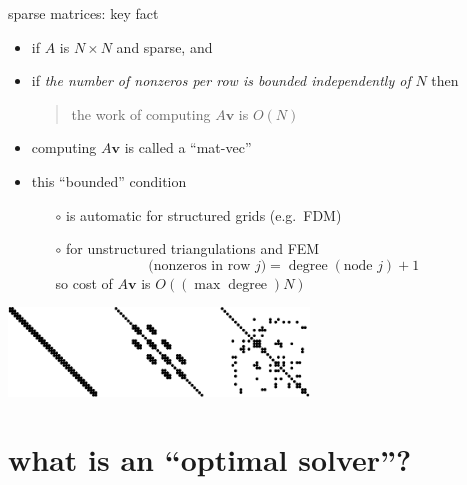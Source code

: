 \documentclass[hide notes,intlimits,usenames,dvipsnames]{beamer}
\newcommand{\bv}{\mathbf{v}}
\begin{document}
\begin{frame}{sparse matrices: key fact}

\begin{itemize}
\item if $A$ is $N\times N$ and sparse, and
\item if \emph{the number of nonzeros per row is bounded independently of} $N$ then
\begin{quote}
the work of computing $A \bv$ is $O(N)$
\end{quote}
\item computing $A \bv$ is called a ``mat-vec''
\item this ``bounded'' condition
	\begin{itemize}
    \item[$\circ$] is automatic for structured grids (e.g.~FDM)
    \item[$\circ$] for unstructured triangulations and FEM
   $$\text{(nonzeros in row } j) = \operatorname{degree}(\text{node } j) + 1$$
	so cost of $A\bv$ is $O((\max \operatorname{degree}) N)$
	\end{itemize}
\end{itemize}

\vspace{5mm}
\begin{center}
\includegraphics[width=0.6\textwidth]{figs/spythree}
\end{center}
\end{frame}


\section{what is an ``optimal solver''?}
\end{document}
